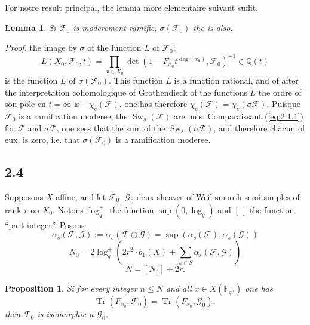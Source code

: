 \documentclass[11pt,a4paper]{article}
\theoremstyle{plain}
\newtheorem{lemma}[theorem]{Lemma}
\newtheorem{proposition}[theorem]{Proposition}
\theoremstyle{definition}
\DeclareMathOperator{\Sw}{Sw}
\DeclareMathOperator{\tr}{Tr}
\begin{document}
For notre result principal, the lemma more elementaire suivant suffit.

\begin{lemma}\label{lem:2.3}
Si $\mathcal{F}_0$ is moderement ramifie, $\sigma(\mathcal{F}_0)$ the is also.
\end{lemma}

\noindent\textit{Proof.} the image by $\sigma$ of the function $L$ of $\mathcal{F}_0$:
\[
L(X_0, \mathcal{F}_0, t) = \prod_{x \in X_0} \det(1 - F_{x_0} t^{\deg(x_0)}, \mathcal{F}_0)^{-1} \in \mathbb{Q}(t)
\]
is the function $L$ of $\sigma(\mathcal{F}_0)$. This function $L$ is a function rational, and of after the interpretation cohomologique of Grothendieck of the functions $L$ the ordre of son pole en $t = \infty$ is $-\chi_c(\mathcal{F})$. one has therefore $\chi_c(\mathcal{F}) = \chi_c(\sigma \mathcal{F})$. Puisque $\mathcal{F}_0$ is a ramification moderee, the $\Sw_s(\mathcal{F})$ are nuls. Comparaissant (\ref{eq:2.1.1}) for $\mathcal{F}$ and $\sigma \mathcal{F}$, one sees that the sum of the $\Sw_s(\sigma \mathcal{F})$, and therefore chacun of eux, is zero, i.e. that $\sigma(\mathcal{F}_0)$ is a ramification moderee.

\subsection{2.4}

Supposons $X$ affine, and let $\mathcal{F}_0$, $\mathcal{G}_0$ deux sheaves of Weil smooth semi-simples of rank $r$ on $X_0$. Notons $\log_q^+$ the function $\sup(0, \log_q)$ and $[\ ]$ the function ``part integer''. Posons
\begin{equation}\label{eq:2.4.1}
\alpha_s(\mathcal{F}, \mathcal{G}) := \alpha_s(\mathcal{F} \oplus \mathcal{G}) = \sup(\alpha_s(\mathcal{F}), \alpha_s(\mathcal{G}))
\end{equation}
\begin{equation}\label{eq:2.4.2}
N_0 = 2\log_q^+\left(2r^2 \cdot b_1(X) + \sum_{s \in S} \alpha_s(\mathcal{F}, \mathcal{G})\right)
\end{equation}
\begin{equation}\label{eq:2.4.3}
N = [N_0] + 2r.
\end{equation}

\begin{proposition}\label{prop:2.5}
Si for every integer $n \leq N$ and all $x \in X(\mathbb{F}_{q^n})$ one has
\[
\tr(F_{x_0}, \mathcal{F}_0) = \tr(F_{x_0}, \mathcal{G}_0),
\]
then $\mathcal{F}_0$ is isomorphic a $\mathcal{G}_0$.
\end{proposition}
\end{document}
